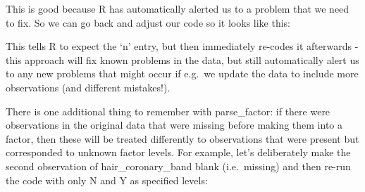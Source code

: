 \documentclass[
]{article}
\newenvironment{Shaded}{\begin{snugshade}}{\end{snugshade}}
\newcommand{\DataTypeTok}[1]{\textcolor[rgb]{0.13,0.29,0.53}{#1}}
\newcommand{\DecValTok}[1]{\textcolor[rgb]{0.00,0.00,0.81}{#1}}
\newcommand{\KeywordTok}[1]{\textcolor[rgb]{0.13,0.29,0.53}{\textbf{#1}}}
\newcommand{\NormalTok}[1]{#1}
\newcommand{\OperatorTok}[1]{\textcolor[rgb]{0.81,0.36,0.00}{\textbf{#1}}}
\newcommand{\StringTok}[1]{\textcolor[rgb]{0.31,0.60,0.02}{#1}}
\begin{document}
This is good because R has automatically alerted us to a problem that we
need to fix. So we can go back and adjust our code so it looks like
this:

\begin{Shaded}
\end{Shaded}

This tells R to expect the `n' entry, but then immediately re-codes it
afterwards - this approach will fix known problems in the data, but
still automatically alert us to any new problems that might occur if
e.g.~we update the data to include more observations (and different
mistakes!).

There is one additional thing to remember with parse\_factor: if there
were observations in the original data that were missing before making
them into a factor, then these will be treated differently to
observations that were present but corresponded to unknown factor
levels. For example, let's deliberately make the second observation of
hair\_coronary\_band blank (i.e.~missing) and then re-run the code with
only N and Y as specified levels:

\begin{Shaded}
\end{Shaded}
\end{document}
